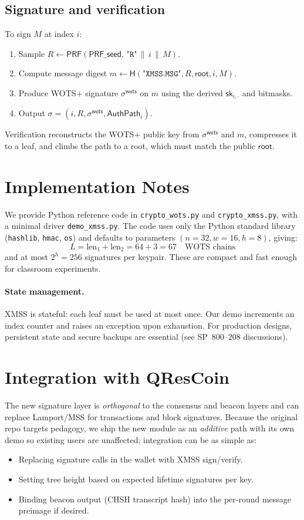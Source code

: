 \documentclass[11pt]{article}
\begin{document}
\subsection{Signature and verification}
To sign $M$ at index $i$:
\begin{enumerate}[nosep]
  \item Sample $R \gets \mathsf{PRF}(\mathsf{PRF\_seed},\, \texttt{"R"} \,\|\, i \,\|\, M)$.
  \item Compute message digest $m \gets \mathsf{H}(\texttt{"XMSS.MSG"}, R, \mathsf{root}, i, M)$.
  \item Produce WOTS+ signature $\sigma^{\mathsf{wots}}$ on $m$ using the derived $\mathsf{sk}_{i,\cdot}$ and bitmasks.
  \item Output $\sigma = (i, R, \sigma^{\mathsf{wots}}, \mathsf{AuthPath}_i)$.
\end{enumerate}
Verification reconstructs the WOTS+ public key from $\sigma^{\mathsf{wots}}$ and $m$, compresses it to a leaf, and climbs the path to a root, which must match the public $\mathsf{root}$.

\section{Implementation Notes}
We provide Python reference code in \texttt{crypto\_wots.py} and \texttt{crypto\_xmss.py}, with a minimal driver \texttt{demo\_xmss.py}. The code uses only the Python standard library (\texttt{hashlib}, \texttt{hmac}, \texttt{os}) and defaults to parameters $(n{=}32, w{=}16, h{=}8)$, giving:
\[
L=\text{len}_1+\text{len}_2 = 64 + 3 = 67 \quad \text{WOTS chains}
\]
and at most $2^h=256$ signatures per keypair. These are compact and fast enough for classroom experiments.

\paragraph{State management.} XMSS is stateful: each leaf must be used at most once. Our demo increments an index counter and raises an exception upon exhaustion. For production designs, persistent state and secure backups are essential (see SP~800--208 discussions).

\section{Integration with QResCoin}
The new signature layer is \emph{orthogonal} to the consensus and beacon layers and can replace Lamport/MSS for transactions and block signatures. Because the original repo targets pedagogy, we ship the new module as an \emph{additive} path with its own demo so existing users are unaffected; integration can be as simple as:
\begin{itemize}[nosep]
  \item Replacing signature calls in the wallet with XMSS sign/verify.
  \item Setting tree height based on expected lifetime signatures per key.
  \item Binding beacon output (CHSH transcript hash) into the per-round message preimage if desired.
\end{itemize}
\end{document}
